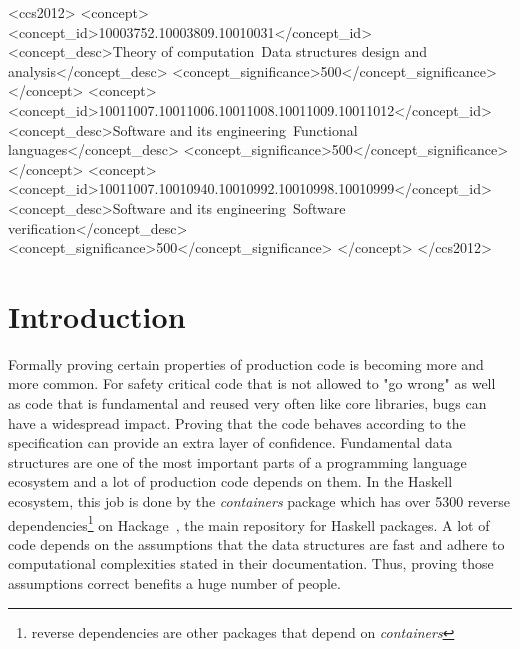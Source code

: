 \documentclass[sigplan,screen]{acmart}
\begin{document}
\begin{CCSXML}
<ccs2012>
   <concept>
       <concept_id>10003752.10003809.10010031</concept_id>
       <concept_desc>Theory of computation~Data structures design and analysis</concept_desc>
       <concept_significance>500</concept_significance>
       </concept>
   <concept>
       <concept_id>10011007.10011006.10011008.10011009.10011012</concept_id>
       <concept_desc>Software and its engineering~Functional languages</concept_desc>
       <concept_significance>500</concept_significance>
       </concept>
   <concept>
       <concept_id>10011007.10010940.10010992.10010998.10010999</concept_id>
       <concept_desc>Software and its engineering~Software verification</concept_desc>
       <concept_significance>500</concept_significance>
       </concept>
 </ccs2012>
\end{CCSXML}



\maketitle

\section{Introduction}

Formally proving certain properties of production code is becoming more and more common. For safety critical code that is not allowed to "go wrong" as well as code that is fundamental and reused very often like core libraries, bugs can have a widespread impact. Proving that the code behaves according to the specification can provide an extra layer of confidence. Fundamental data structures are one of the most important parts of a programming language ecosystem and a lot of production code depends on them. In the Haskell ecosystem, this job is done by the \textit{containers} package which has over 5300 reverse dependencies\footnote{reverse dependencies are other packages that depend on \textit{containers}} on Hackage~\cite{hackage}, the main repository for Haskell packages. A lot of code depends on the assumptions that the data structures are fast and adhere to computational complexities stated in their documentation. Thus, proving those assumptions correct benefits a huge number of people.
\end{document}
